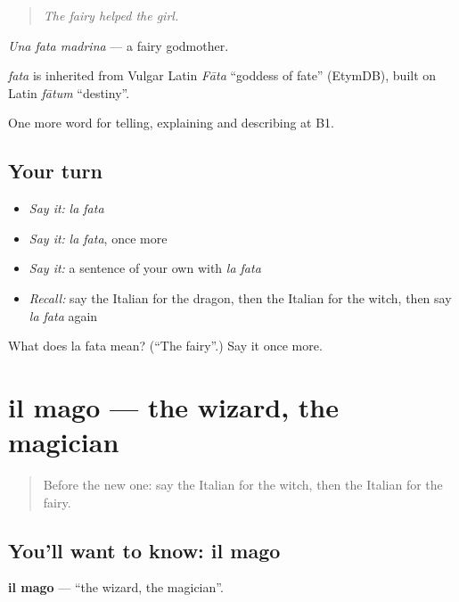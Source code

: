 \begin{quote}
\emph{The fairy helped the girl.}
\end{quote}

\emph{Una fata madrina} — a fairy godmother.

\begin{cousinweb}
\emph{fata} is inherited from Vulgar Latin \emph{Fāta} \textquotedblleft{}goddess of fate\textquotedblright{} (EtymDB), built on Latin \emph{fātum} \textquotedblleft{}destiny\textquotedblright{}.
\end{cousinweb}

\begin{grammarlens}[title={What you've built}]
One more word for telling, explaining and describing at B1.
\end{grammarlens}

\subsection*{Your turn}
\begin{itemize}
\raggedright
  \item \emph{Say it:} \emph{la fata}
  \item \emph{Say it:} \emph{la fata}, once more
  \item \emph{Say it:} a sentence of your own with \emph{la fata}
  \item \emph{Recall:} say the Italian for the dragon, then the Italian for the witch, then say \emph{la fata} again
\end{itemize}

\begin{tcolorbox}[breakable,colback=teal!4,colframe=teal!35!black,title={Before you move on}]
What does la fata mean? (\textquotedblleft{}The fairy\textquotedblright{}.) Say it once more.
\end{tcolorbox}
\section[il mago]{il mago — the wizard, the magician}

\label{lesson:IT-C326-mago}



\begin{quote}
Before the new one: say the Italian for the witch, then the Italian for the fairy.
\end{quote}

\subsection*{You'll want to know: il mago}
\textbf{il mago} — \textquotedblleft{}the wizard, the magician\textquotedblright{}.

